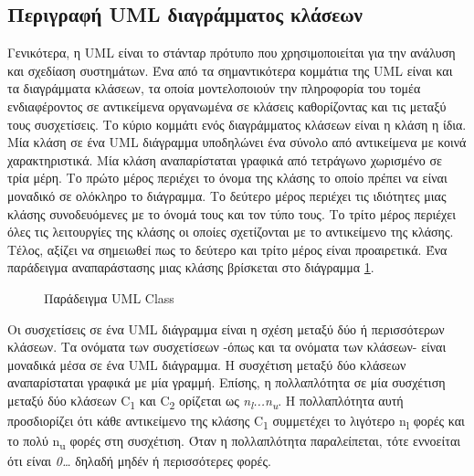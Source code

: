 \documentclass[oneside, 12pt]{book}
\begin{document}
\subsection{Περιγραφή UML διαγράμματος κλάσεων}
Γενικότερα, η UML είναι το στάνταρ πρότυπο που χρησιμοποιείται για την 
ανάλυση και σχεδίαση συστημάτων. Ένα από τα σημαντικότερα κομμάτια της 
UML είναι και τα διαγράμματα κλάσεων, τα οποία μοντελοποιούν την 
πληροφορία του τομέα ενδιαφέροντος σε αντικείμενα οργανωμένα σε 
κλάσεις καθορίζοντας και τις μεταξύ τους συσχετίσεις. Το κύριο κομμάτι 
ενός διαγράμματος κλάσεων είναι η κλάση η ίδια. Μία κλάση σε ένα UML 
διάγραμμα υποδηλώνει ένα σύνολο από αντικείμενα με κοινά 
χαρακτηριστικά. Μία κλάση αναπαρίσταται γραφικά από τετράγωνο 
χωρισμένο σε τρία μέρη. Το πρώτο μέρος περιέχει το όνομα της κλάσης το 
οποίο πρέπει να είναι μοναδικό σε ολόκληρο το διάγραμμα. Το δεύτερο 
μέρος περιέχει τις ιδιότητες μιας κλάσης συνοδευόμενες με το όνομά 
τους και τον τύπο τους. Το τρίτο μέρος περιέχει όλες τις λειτουργίες 
της κλάσης οι οποίες σχετίζονται με το αντικείμενο της κλάσης. Τέλος, 
αξίζει να σημειωθεί πως το δεύτερο και τρίτο μέρος είναι προαιρετικά.
Ένα παράδειγμα αναπαράστασης μιας κλάσης βρίσκεται στο διάγραμμα \ref{fig:uml_diagram_class}.
\begin{figure}[h]
\centering
{}
\caption{\label{fig:uml_diagram_class}Παράδειγμα UML Class}
\end{figure}

Οι συσχετίσεις σε ένα UML διάγραμμα είναι η σχέση μεταξύ δύο ή 
περισσότερων κλάσεων. Τα ονόματα των συσχετίσεων -όπως και τα ονόματα 
των κλάσεων- είναι μοναδικά μέσα σε ένα UML διάγραμμα. Η συσχέτιση 
μεταξύ δύο κλάσεων αναπαρίσταται γραφικά με μία γραμμή. Επίσης, η 
πολλαπλότητα σε μία συσχέτιση μεταξύ δύο κλάσεων C\textsubscript{1} 
και C\textsubscript{2} ορίζεται ως 
\textit{n\textsubscript{l}...n\textsubscript{u}}. Η πολλαπλότητα αυτή 
προσδιορίζει ότι κάθε αντικείμενο της κλάσης C\textsubscript{1} 
συμμετέχει το λιγότερο n\textsubscript{l} φορές και το πολύ 
n\textsubscript{u} φορές στη συσχέτιση. Όταν η πολλαπλότητα 
παραλείπεται, τότε εννοείται ότι είναι \textit{0\ldots*} δηλαδή μηδέν ή 
περισσότερες φορές. 
\end{document}
